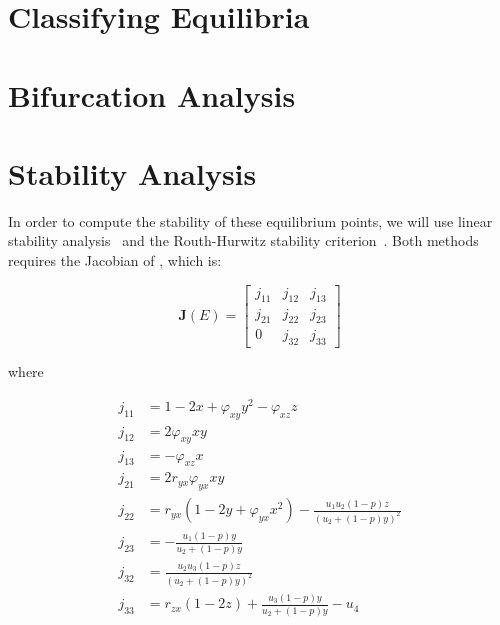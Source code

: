\section{Classifying Equilibria}
\section{Bifurcation Analysis}
\section{Stability Analysis}
In order to compute the stability of these equilibrium points, we will use linear stability analysis~\cite{Strogatz9780813349107} and the Routh-Hurwitz stability criterion~\cite{YANG2002615621}. Both methods requires the Jacobian of , which is:

\begin{equation}\label{matrix:jacobian-model}
    \textbf{J}\left(E\right) = \begin{bmatrix}
        j_{11} & j_{12} & j_{13}\\
        j_{21} & j_{22} & j_{23}\\
        0 & j_{32} & j_{33}
    \end{bmatrix}
\end{equation}


where

\begin{align*}
    j_{11} &= 1-2x+\varphi_{xy}y^2-\varphi_{xz}z\\
    j_{12} &= 2\varphi_{xy}xy\\
    j_{13} &= -\varphi_{xz}x\\
    j_{21} &= 2r_{yx}\varphi_{yx}xy\\
    j_{22} &= r_{yx}\left(1-2y+\varphi_{yx}x^2\right)-\frac{u_1u_2\left(1-p\right)z}{\left(u_2+\left(1-p\right)y\right)^2}\\
    j_{23} &= -\frac{u_1\left(1-p\right)y}{u_2+\left(1-p\right)y}\\
    j_{32} &= \frac{u_2u_3\left(1-p\right)z}{\left(u_2+\left(1-p\right)y\right)^2}\\
    j_{33} &= r_{zx}\left(1-2z\right)+\frac{u_3\left(1-p\right)y}{u_2+\left(1-p\right)y}-u_4
\end{align*}

